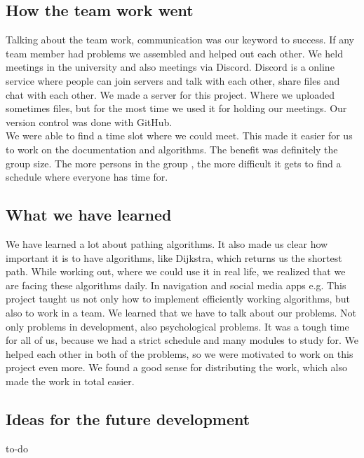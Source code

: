\documentclass[a4paper,12pt]{article}
\begin{document}
\subsection{How the team work went}
Talking about the team work, communication was our keyword to success. If any team member had problems we assembled and helped out each other. We held meetings in the university and also meetings via Discord. Discord is a online service where people can join servers and talk with each other, share files and chat with each other. We made a server for this project. Where we uploaded sometimes files, but for the most time we used it for holding our meetings. Our version control was done with GitHub.\\
We were able to find a time slot where we could meet. This made it easier for us to work on the documentation and algorithms. The benefit was definitely the group size. The more persons in the group , the more difficult it gets to find a schedule where everyone has time for.
\subsection{What we have learned}
We have learned a lot about pathing algorithms. It also made us clear how important it is to have algorithms, like Dijkstra, which returns us the shortest path. While working out, where we could use it in real life, we realized that we are facing these algorithms daily.  In navigation and social media apps e.g.
This project taught us not only how to implement efficiently working algorithms, but also to work in a team. We learned that we have to talk about our problems. Not only problems in development, also psychological problems. It was a tough time for all of us, because we had a strict schedule and many modules to study for. We helped each other in both of the problems, so we were motivated to work on this project even more. We found a good sense for distributing the work, which also made the work in total easier.
\subsection{Ideas for the future development}
to-do
\newpage


\end{document}
